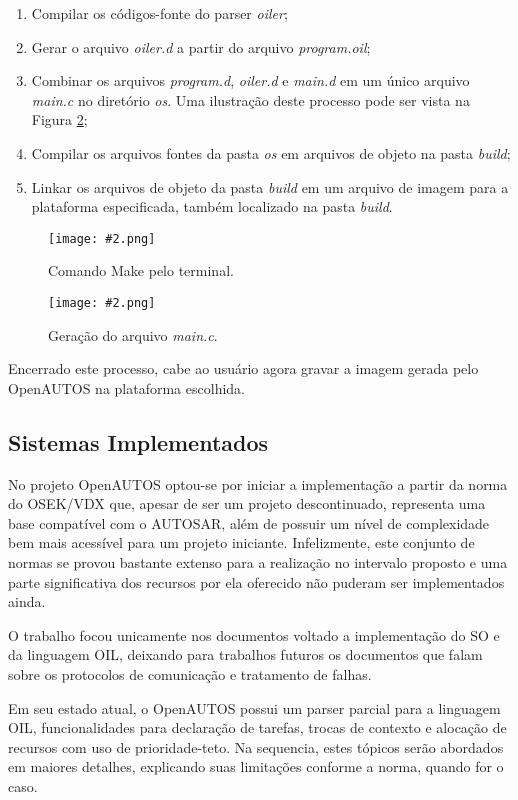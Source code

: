 \documentclass[conference,compsoc]{IEEEtran}
\newcommand{\reffig}[1]{Figura \ref{fig:#1}}
\newcommand{\figura}[5][Extraido de:]{
	\begin{figure}[h!tb]
		\centering
		\caption{#3.}
		\texttt{[image: \#2.png]}
		\ifthenelse{\isempty{#5}}{}{%
			\\ #1 \cite{#5}.
		}	
		\label{fig:#2}
	\end{figure}
}
\begin{document}
\begin{enumerate}
	\item Compilar os códigos-fonte do parser \emph{oiler};
	\item Gerar o arquivo \emph{oiler.d} a partir do arquivo \emph{program.oil};
	\item Combinar os arquivos \emph{program.d}, \emph{oiler.d} e \emph{main.d} em um único arquivo \emph{main.c} no diretório \emph{os}. Uma ilustração deste processo pode ser vista na \reffig{cap4_oiler_merge};
	\item Compilar os arquivos fontes da pasta \emph{os} em arquivos de objeto na pasta \emph{build};
	\item Linkar os arquivos de objeto da pasta \emph{build} em um arquivo de imagem para a plataforma especificada, também localizado na pasta \emph{build}.
\end{enumerate}

\figura{cap4_make_terminal}{Comando Make pelo terminal}{7cm}{}

\figura{cap4_oiler_merge}{Geração do arquivo \emph{main.c}}{7cm}{}

Encerrado este processo, cabe ao usuário agora gravar a imagem gerada pelo OpenAUTOS na plataforma escolhida.

\subsection{Sistemas Implementados}

No projeto OpenAUTOS optou-se por iniciar a implementação a partir da norma do OSEK/VDX que, apesar de ser um projeto descontinuado, representa uma base compatível com o AUTOSAR, além de possuir um nível de complexidade bem mais acessível para um projeto iniciante. Infelizmente, este conjunto de normas se provou bastante extenso para a realização no intervalo proposto e uma parte significativa dos recursos por ela oferecido não puderam ser implementados ainda.

O trabalho focou unicamente nos documentos voltado a implementação do SO e da linguagem OIL, deixando para trabalhos futuros os documentos que falam sobre os protocolos de comunicação e tratamento de falhas.

Em seu estado atual, o OpenAUTOS possui um parser parcial para a linguagem OIL, funcionalidades para declaração de tarefas, trocas de contexto e alocação de recursos com uso de prioridade-teto. Na sequencia, estes tópicos serão abordados em maiores detalhes, explicando suas limitações conforme a norma, quando for o caso.
\end{document}
